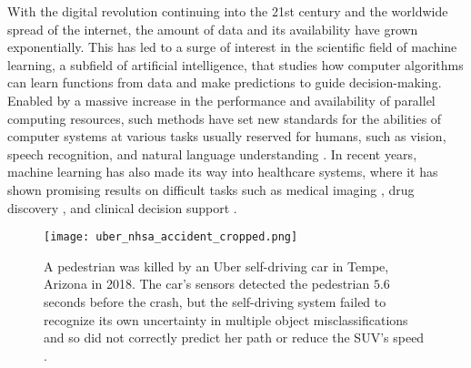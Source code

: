With the digital revolution continuing into the 21st century and the worldwide spread of the internet, the amount of data and its availability have grown exponentially. 
This has led to a surge of interest in the scientific field of machine learning, a subfield of artificial intelligence, that studies how computer algorithms can learn functions from data and make predictions to guide decision-making. 
Enabled by a massive increase in the performance and availability of parallel computing resources, such methods have set new standards for the abilities of computer systems at various tasks usually reserved for humans, such as vision, speech recognition, and natural language understanding \parencite{lecun_deep_2015}. 
In recent years, machine learning has also made its way into healthcare systems, where it has shown promising results on difficult tasks such as medical imaging \parencite{lundervold_overview_2019}, drug discovery \parencite{chen_rise_2018}, and clinical decision support \parencite{cite15, cite14}. 

\begin{figure}[t]
    \centering
    \texttt{[image: uber\_nhsa\_accident\_cropped.png]}
    \caption[A pedestrian was killed by an Uber self-driving car in Tempe, Arizona in 2018.]{ A pedestrian was killed by an Uber self-driving car in Tempe, Arizona in 2018. The car's sensors detected the pedestrian $5.6$ seconds before the crash, but the self-driving system failed to recognize its own uncertainty in multiple object misclassifications and so did not correctly predict her path or reduce the SUV's speed \parencite[photo credit]{nationaltransportationsafetyboardnhsa_collision_2019}.}
    \label{fig:uber_nhsa_accident}
\end{figure}



